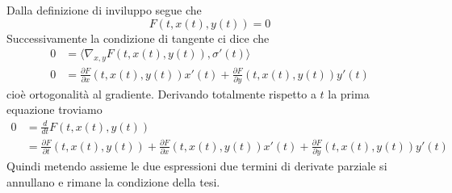 \documentclass[a4paper]{article}
\begin{document}
\begin{radioactive}
\begin{snippetproof}{}
    Dalla definizione di inviluppo segue che
    \[
        F(t, x(t), y(t)) = 0
    \]
    Successivamente la condizione di tangente ci dice che
    \begin{align*}
        0 &= \langle \nabla_{x,y} F(t,x(t), y(t)), \sigma'(t) \rangle \\
        0 &= \frac{\partial F}{\partial x}(t, x(t), y(t))x'(t) + \frac{\partial F}{\partial y}(t, x(t), y(t))y'(t)
    \end{align*}
    cioè ortogonalità al gradiente.
    Derivando totalmente rispetto a \(t\) la prima equazione troviamo
    \begin{align*}
        0 &= \frac{d}{dt} F(t,x(t),y(t)) \\
        &= \frac{\partial F}{\partial t}(t, x(t), y(t))
        + \frac{\partial F}{\partial x}(t, x(t), y(t))x'(t)
        + \frac{\partial F}{\partial y}(t, x(t), y(t))y'(t)
    \end{align*}
    Quindi metendo assieme le due espressioni due termini di derivate parziale si annullano e rimane
    la condizione della tesi.
\end{snippetproof}
\end{radioactive}

\pagebreak
\end{document}
